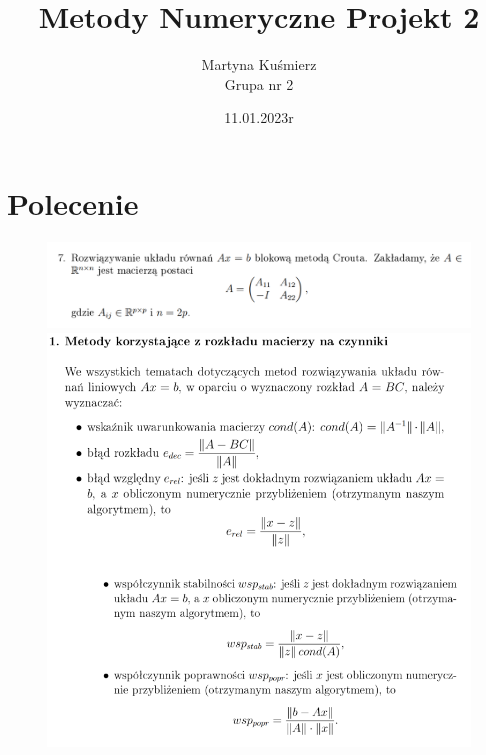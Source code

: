 \documentclass[11pt]{article}
\title{Metody Numeryczne Projekt 2}
\author{Martyna Kuśmierz\\Grupa nr 2}
\date{11.01.2023r}
\begin{document}
\maketitle

\section{Polecenie}

\begin{figure}[h]
    \includegraphics[scale=0.7]{Polecenie.png}
    \centering
    \includegraphics[scale=0.7]{Polecenie2.png}
\end{figure}
\end{document}
